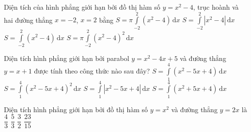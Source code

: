 \begin{ex}%
Diện tích của hình phẳng giới hạn bởi đồ thị hàm số $y=x^2-4$, trục hoành và hai đường thẳng $x=-2$, $x=2$ bằng
	\choice
	{$S=\pi\displaystyle\int\limits_{-2}^2\left(x^2-4\right)\mathrm{\,d}x$}
	{\True $S=\displaystyle\int\limits_{-2}^2\left|x^2-4\right|\mathrm{\,d}x$}
	{$S=\displaystyle\int\limits_{-2}^2\left(x^2-4\right)\mathrm{\,d}x$}
	{$S=\pi\displaystyle\int\limits_{-2}^2\left(x^2-4\right)^2\mathrm{\,d}x$}
\end{ex}

\begin{ex}%
Diện tích hình phẳng giới hạn bởi parabol $y=x^2-4x+5$ và đường thẳng $y=x+1$ được tính theo công thức nào sau đây?
	\choice
	{$S=\displaystyle\int\limits_1^4\left(x^2-5x+4\right)\mathrm{\,d}x$}
	{$S=\displaystyle\int\limits_1^4\left(x^2-5x+4\right)^2\mathrm{\,d}x$}
	{$S=\displaystyle\int\limits_1^4\left|x^2-5x+4\right|\mathrm{\,d}x$}
	{\True $S=\displaystyle\int\limits_1^4\left(x^2+5x+4\right)\mathrm{\,d}x$}
\end{ex}

\begin{ex}%
Diện tích hình phẳng giới hạn bởi đồ thị hàm số $y=x^2$ và đường thẳng $y=2x$ là 
	\choice
	{\True $\dfrac{4}{3}$}
	{$\dfrac{5}{3}$}
	{$\dfrac{3}{2}$}
	{$\dfrac{23}{15}$}
\end{ex}

